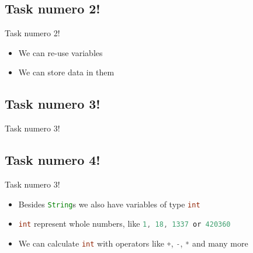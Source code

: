\subsection{Task numero 2!}
\begin{frame}[fragile]{Task numero 2!}
	\begin{itemize}[<+->]
		\item We can re-use variables
		\item We can store data in them
	\end{itemize}
\end{frame}


\subsection{Task numero 3!}
\begin{frame}[fragile]{Task numero 3!}
	\begin{center}
		
	\end{center}
\end{frame}


\subsection{Task numero 4!}
\begin{frame}[fragile]{Task numero 3!}
	\begin{itemize}[<+->]
		\item Besides \lstinline[language=Java]{String}s we also have variables of type \lstinline[language=Java]{int}\\
		\item \lstinline[language=Java]{int} represent whole numbers, like \lstinline[language=Java]{1, 18, 1337 or 420360}\\
		\item We can calculate \lstinline[language=Java]{int} with operators like \lstinline[language=Java]{+}, \lstinline[language=Java]{-}, \lstinline[language=Java]{*} and many more
	\end{itemize}
\end{frame}


